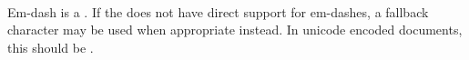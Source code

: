  \\

Em-dash is a . If the  does not have direct support for em-dashes, a fallback character may be used when appropriate instead. In unicode encoded documents, this should be . \\

\begin{examples}
\end{examples}

